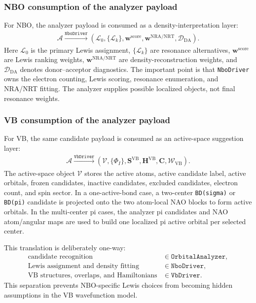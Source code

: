 \documentclass[11pt]{article}
\newcommand{\vb}{\mathrm{VB}}
\begin{document}
\subsubsection*{NBO consumption of the analyzer payload}

For NBO, the analyzer payload is consumed as a density-interpretation layer:
\begin{equation}
\begin{aligned}
	\mathcal{A}
	\xrightarrow{\texttt{NboDriver}}
	\left(\mathcal{L}_0,\{\mathcal{L}_k\},\mathbf{w}^{\mathrm{score}},
	\mathbf{w}^{\mathrm{NRA/NRT}},\mathcal{D}_{\mathrm{DA}}\right).
\end{aligned}
\end{equation}
Here $\mathcal{L}_0$ is the primary Lewis assignment, $\{\mathcal{L}_k\}$ are resonance alternatives, $\mathbf{w}^{\mathrm{score}}$ are Lewis ranking weights, $\mathbf{w}^{\mathrm{NRA/NRT}}$ are density-reconstruction weights, and $\mathcal{D}_{\mathrm{DA}}$ denotes donor--acceptor diagnostics.  The important point is that \texttt{NboDriver} owns the electron counting, Lewis scoring, resonance enumeration, and NRA/NRT fitting.  The analyzer supplies possible localized objects, not final resonance weights.

\subsubsection*{VB consumption of the analyzer payload}

For VB, the same candidate payload is consumed as an active-space suggestion layer:
\begin{equation}
\begin{aligned}
	\mathcal{A}
	\xrightarrow{\texttt{VbDriver}}
	\left(\mathcal{V},\{\Phi_I\},\mathbf{S}^{\vb},\mathbf{H}^{\vb},\mathbf{C},\mathcal{W}_{\vb}\right).
\end{aligned}
\end{equation}
The active-space object $\mathcal{V}$ stores the active atoms, active candidate label, active orbitals, frozen candidates, inactive candidates, excluded candidates, electron count, and spin sector.  In a one-active-bond case, a two-center \texttt{BD(sigma)} or \texttt{BD(pi)} candidate is projected onto the two atom-local NAO blocks to form active orbitals.  In the multi-center pi cases, the analyzer pi candidates and NAO atom/angular maps are used to build one localized pi active orbital per selected center.

This translation is deliberately one-way:
\begin{equation}
\begin{aligned}
	\text{candidate recognition} &\in \texttt{OrbitalAnalyzer}, \\
	\text{Lewis assignment and density fitting} &\in \texttt{NboDriver}, \\
	\text{VB structures, overlaps, and Hamiltonians} &\in \texttt{VbDriver}.
\end{aligned}
\end{equation}
This separation prevents NBO-specific Lewis choices from becoming hidden assumptions in the VB wavefunction model.
\end{document}
